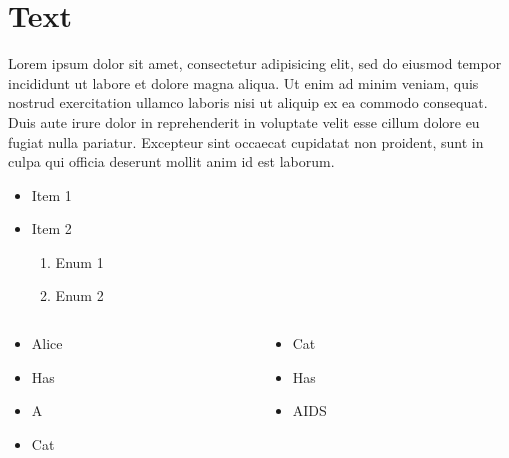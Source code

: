 \section{Text}


{
\begin{multicols}{2}
Lorem ipsum dolor sit amet, consectetur adipisicing elit, sed do eiusmod tempor incididunt ut labore et dolore magna aliqua. Ut enim ad minim veniam, quis nostrud exercitation ullamco laboris nisi ut aliquip ex ea commodo consequat. Duis aute irure dolor in reprehenderit in voluptate velit esse cillum dolore eu fugiat nulla pariatur. Excepteur sint occaecat cupidatat non proident, sunt in culpa qui officia deserunt mollit anim id est laborum.
\end{multicols}
}


{
\begin{itemize}
\item Item 1
\pause

\item Item 2
\begin{enumerate}
\item Enum 1
\item Enum 2
\end{enumerate}
\end{itemize}
}


{
\begin{columns}

\begin{column}{0.45\textwidth}
\begin{itemize}
\item Alice
\item Has
\item A
\item Cat
\end{itemize}
\end{column}

\begin{column}{0.45\textwidth}
\begin{itemize}
\item Cat
\item Has
\item AIDS
\end{itemize}
\end{column}

\end{columns}
}


